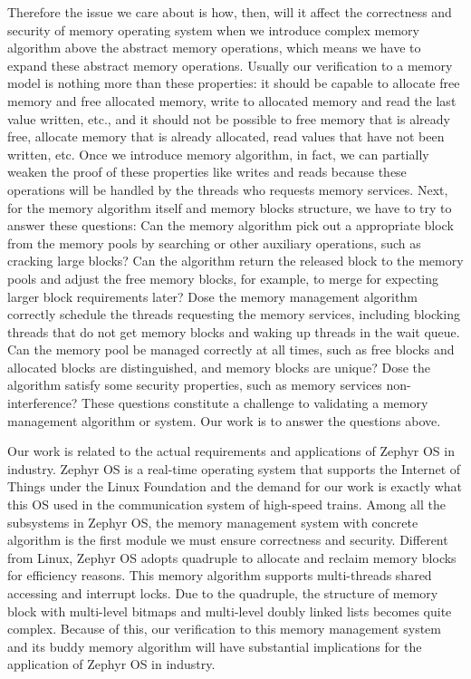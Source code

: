 \documentclass[runningheads]{llncs}
\begin{document}
Therefore the issue we care about is how, then, will it affect the correctness and security of memory operating system when we introduce complex memory algorithm above the abstract memory operations, which means we have to expand these abstract memory operations. Usually our verification to a memory model is nothing more than these properties: it should be capable to allocate free memory and free allocated memory, write to allocated memory and read the last value written, etc., and it should not be possible to free memory that is already free, allocate memory that is already allocated, read values that have not been written, etc. Once we introduce memory algorithm, in fact, we can partially weaken the proof of these properties like writes and reads because these operations will be handled by the threads who requests memory services. Next, for the memory algorithm itself and memory blocks structure, we have to try to answer these questions: Can the memory algorithm pick out a appropriate block from the memory pools by searching or other auxiliary operations, such as cracking large blocks? Can the algorithm return the released block to the memory pools and adjust the free memory blocks, for example, to merge for expecting larger block requirements later? Dose the memory management algorithm correctly schedule the threads requesting the memory services, including blocking threads that do not get memory blocks and waking up threads in the wait queue. Can the memory pool be managed correctly at all times, such as free blocks and allocated blocks are distinguished, and memory blocks are unique? Dose the algorithm satisfy some security properties, such as memory services non-interference? These questions constitute a challenge to validating a memory management algorithm or system. Our work is to answer the questions above.

Our work is related to the actual requirements and applications of Zephyr OS in industry. Zephyr OS is a real-time operating system that supports the Internet of Things under the Linux Foundation and the demand for our work is exactly what this OS used in the communication system of high-speed trains. Among all the subsystems in Zephyr OS, the memory management system with concrete algorithm is the first module we must ensure correctness and security. Different from Linux, Zephyr OS adopts quadruple to allocate and reclaim memory blocks for efficiency reasons. This memory algorithm supports multi-threads shared accessing and interrupt locks. Due to the quadruple, the structure of memory block with multi-level bitmaps and multi-level doubly linked lists becomes quite complex. Because of this, our verification to this memory management system and its buddy memory algorithm will have substantial implications for the application of Zephyr OS in industry.
\end{document}
